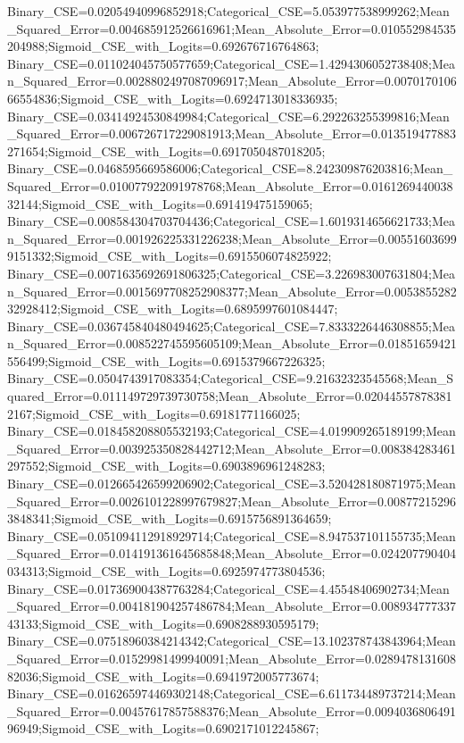Binary_CSE=0.02054940996852918;Categorical_CSE=5.053977538999262;Mean_Squared_Error=0.004685912526616961;Mean_Absolute_Error=0.010552984535204988;Sigmoid_CSE_with_Logits=0.692676716764863;
Binary_CSE=0.011024045750577659;Categorical_CSE=1.4294306052738408;Mean_Squared_Error=0.0028802497087096917;Mean_Absolute_Error=0.007017010666554836;Sigmoid_CSE_with_Logits=0.6924713018336935;
Binary_CSE=0.03414924530849984;Categorical_CSE=6.292263255399816;Mean_Squared_Error=0.006726717229081913;Mean_Absolute_Error=0.013519477883271654;Sigmoid_CSE_with_Logits=0.6917050487018205;
Binary_CSE=0.0468595669586006;Categorical_CSE=8.242309876203816;Mean_Squared_Error=0.010077922091978768;Mean_Absolute_Error=0.016126944003832144;Sigmoid_CSE_with_Logits=0.691419475159065;
Binary_CSE=0.008584304703704436;Categorical_CSE=1.6019314656621733;Mean_Squared_Error=0.001926225331226238;Mean_Absolute_Error=0.005516036999151332;Sigmoid_CSE_with_Logits=0.6915506074825922;
Binary_CSE=0.0071635692691806325;Categorical_CSE=3.226983007631804;Mean_Squared_Error=0.0015697708252908377;Mean_Absolute_Error=0.005385528232928412;Sigmoid_CSE_with_Logits=0.6895997601084447;
Binary_CSE=0.036745840480494625;Categorical_CSE=7.8333226446308855;Mean_Squared_Error=0.008522745595605109;Mean_Absolute_Error=0.01851659421556499;Sigmoid_CSE_with_Logits=0.6915379667226325;
Binary_CSE=0.0504743917083354;Categorical_CSE=9.21632323545568;Mean_Squared_Error=0.011149729739730758;Mean_Absolute_Error=0.020445578783812167;Sigmoid_CSE_with_Logits=0.69181771166025;
Binary_CSE=0.018458208805532193;Categorical_CSE=4.019909265189199;Mean_Squared_Error=0.003925350828442712;Mean_Absolute_Error=0.008384283461297552;Sigmoid_CSE_with_Logits=0.6903896961248283;
Binary_CSE=0.012665426599206902;Categorical_CSE=3.520428180871975;Mean_Squared_Error=0.0026101228997679827;Mean_Absolute_Error=0.008772152963848341;Sigmoid_CSE_with_Logits=0.6915756891364659;
Binary_CSE=0.051094112918929714;Categorical_CSE=8.947537101155735;Mean_Squared_Error=0.014191361645685848;Mean_Absolute_Error=0.024207790404034313;Sigmoid_CSE_with_Logits=0.6925974773804536;
Binary_CSE=0.017369004387763284;Categorical_CSE=4.45548406902734;Mean_Squared_Error=0.004181904257486784;Mean_Absolute_Error=0.00893477733743133;Sigmoid_CSE_with_Logits=0.6908288930595179;
Binary_CSE=0.07518960384214342;Categorical_CSE=13.102378743843964;Mean_Squared_Error=0.01529981499940091;Mean_Absolute_Error=0.028947813160882036;Sigmoid_CSE_with_Logits=0.6941972005773674;
Binary_CSE=0.016265974469302148;Categorical_CSE=6.611734489737214;Mean_Squared_Error=0.00457617857588376;Mean_Absolute_Error=0.009403680649196949;Sigmoid_CSE_with_Logits=0.6902171012245867;

